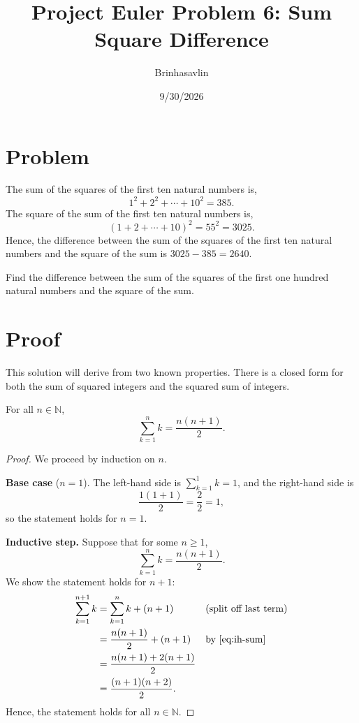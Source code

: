 \documentclass{article}
\title{Project Euler Problem 6: Sum Square Difference}
\author{Brinhasavlin}
\date{9/30/2026}
\begin{document}
\maketitle


\section*{Problem}

The sum of the squares of the first ten natural numbers is,
\[
  1^2 + 2^2 + \cdots + 10^2 = 385.
\]
The square of the sum of the first ten natural numbers is,
\[
{(1 + 2 + \cdots + 10)}^2 = 55^2 = 3025.
\]
Hence, the difference between the sum of the squares of the first ten natural
numbers and the square of the sum is $3025 - 385 = 2640$.

Find the difference between the sum of the squares of the first one hundred
natural numbers and the square of the sum.


\section*{Proof}
This solution will derive from two known properties. There is a closed form for both the sum of squared integers and the squared sum of integers.

\begin{lemma}\label{lem:sum}
  For all $n \in \mathbb{N}$,
  \[
    \sum_{k=1}^{n} k = \frac{n(n+1)}{2}.
  \]
\end{lemma}
\begin{proof}
  We proceed by induction on $n$.

  \textbf{Base case} ($n = 1$).
  The left-hand side is $\sum_{k=1}^{1} k = 1$, and the right-hand side is
  \[
    \frac{1(1+1)}{2} = \frac{2}{2} = 1,
  \]
  so the statement holds for $n = 1$.

  \textbf{Inductive step.}
  Suppose that for some $n \ge 1$,
  \begin{equation}\label{eq:ih-sum}
    \sum_{k=1}^{n} k = \frac{n(n+1)}{2}. \tag{IH}
  \end{equation}
  We show the statement holds for $n+1$:
  \begin{align*}
    \sum_{k=1}^{n+1} k
      &= \sum_{k=1}^{n} k + (n+1)  && \text{(split off last term)} \\
      &= \frac{n(n+1)}{2} + (n+1)  && \text{by~\eqref{eq:ih-sum}} \\
      &= \frac{n(n+1) + 2(n+1)}{2} \\
      &= \frac{(n+1)(n+2)}{2}.
  \end{align*}
  Hence, the statement holds for all $n \in \mathbb{N}$.
\end{proof}
\end{document}
